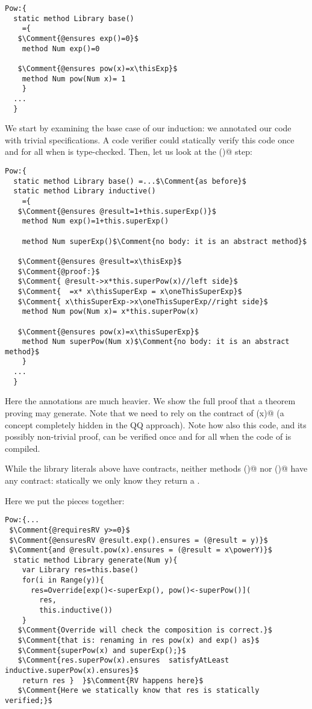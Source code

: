 \begin{lstlisting}
Pow:{
  static method Library base()
    ={
   $\Comment{@ensures exp()=0}$
    method Num exp()=0 
    
   $\Comment{@ensures pow(x)=x\thisExp}$
    method Num pow(Num x)= 1 
    }
  ...
  }
\end{lstlisting}


\noindent
We start by examining the base case of our induction: we annotated our 
code with trivial specifications.
A code verifier could statically verify this code 
once and for all when \Q@Pow@ is type-checked.
Then, let us look at the \Q@inductive()@ step:

\begin{lstlisting}
Pow:{
  static method Library base() =...$\Comment{as before}$
  static method Library inductive() 
    ={
   $\Comment{@ensures @result=1+this.superExp()}$
    method Num exp()=1+this.superExp() 
      
    method Num superExp()$\Comment{no body: it is an abstract method}$
      
   $\Comment{@ensures @result=x\thisExp}$
   $\Comment{@proof:}$
   $\Comment{ @result->x*this.superPow(x)//left side}$
   $\Comment{  =x* x\thisSuperExp = x\oneThisSuperExp}$
   $\Comment{ x\thisSuperExp->x\oneThisSuperExp//right side}$
    method Num pow(Num x)= x*this.superPow(x)
      
   $\Comment{@ensures pow(x)=x\thisSuperExp}$
    method Num superPow(Num x)$\Comment{no body: it is an abstract method}$
    }
  ...
  }
\end{lstlisting}

Here the annotations are much heavier.
We show the full proof that a theorem proving may generate.
Note that we need to rely on the contract of \Q@superPow(x)@ (a concept completely hidden in the QQ approach).
Note how also this code, and its possibly non-trivial proof, can be verified once and for all when the code of \Q@Pow@ is compiled.

While the library literals above have contracts,
neither methods \Q@base()@ nor \Q@inductive()@ have any contract:
statically we only know they return a \Q@Library@.

\noindent
Here we put the pieces together:

\begin{lstlisting}
Pow:{...
 $\Comment{@requiresRV y>=0}$
 $\Comment{@ensuresRV @result.exp().ensures = (@result = y)}$
 $\Comment{and @result.pow(x).ensures = (@result = x\powerY)}$
  static method Library generate(Num y){
    var Library res=this.base()
    for(i in Range(y)){
      res=Override[exp()<-superExp(), pow()<-superPow()](
        res,
        this.inductive())
    }
   $\Comment{Override will check the composition is correct.}$
   $\Comment{that is: renaming in res pow(x) and exp() as}$
   $\Comment{superPow(x) and superExp();}$
   $\Comment{res.superPow(x).ensures  satisfyAtLeast inductive.superPow(x).ensures}$
    return res }  }$\Comment{RV happens here}$
   $\Comment{Here we statically know that res is statically verified;}$
\end{lstlisting}

